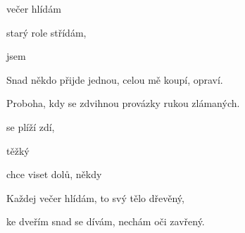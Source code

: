 
\zs
{} večer hlídám
  

 starý role střídám,
   
\ks

\zr
{}   jsem 

   

  
\kr


\zs
Snad někdo přijde jednou,
celou mě koupí, opraví.

Proboha, kdy se zdvihnou
provázky rukou zlámaných.
\ks

\zr
\kr

\zs
{} se plíží  zdí,

 těžký 

 chce viset  dolů,
 někdy 
\ks

\zs
Každej večer hlídám,
to svý tělo dřevěný,

ke dveřím snad se dívám,
nechám oči zavřený.
\ks


\zr \kr
\kp


